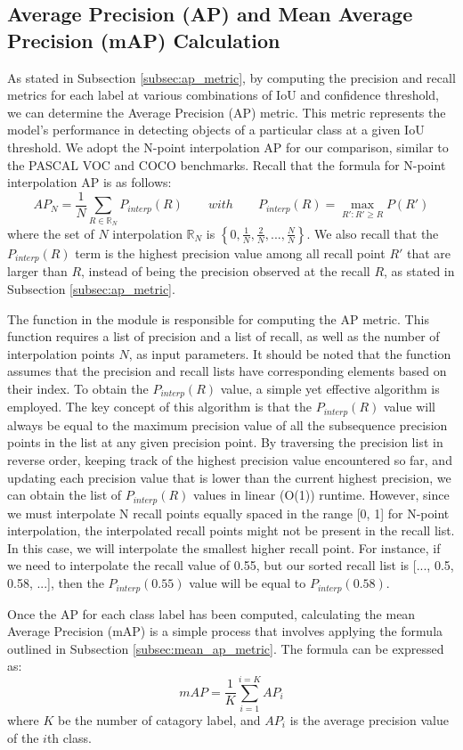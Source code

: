 \subsection{Average Precision (AP) and Mean Average Precision (mAP) Calculation}
As stated in Subsection \ref{subsec:ap_metric}, by computing the precision and recall metrics for each label at various combinations of IoU and confidence threshold, we can determine the Average Precision (AP) metric. This metric represents the model's performance in detecting objects of a particular class at a given IoU threshold. We adopt the N-point interpolation AP for our comparison, similar to the PASCAL VOC and COCO benchmarks. Recall that the formula for N-point interpolation AP is as follows:
\begin{equation}
    AP_N = \frac{1}{N} \sum_{R \in \mathbb{R}_N} P_{interp}(R) \qquad with \qquad P_{interp}(R) = \max_{{R}':{R}' \geq R} P({R}')
\end{equation}
where the set of $N$ interpolation $\mathbb{R}_N$ is $\left\{0, \frac{1}{N}, \frac{2}{N}, ..., \frac{N}{N}\right\}$. We also recall that the $P_{interp}(R)$ term is the highest precision value among all recall point ${R}'$ that are larger than $R$, instead of being the precision observed at the recall $R$, as stated in Subsection \ref{subsec:ap_metric}.

The  function in the  module is responsible for computing the AP metric. This function requires a list of precision and a list of recall, as well as the number of interpolation points $N$, as input parameters. It should be noted that the function assumes that the precision and recall lists have corresponding elements based on their index. To obtain the $P_{interp}(R)$ value, a simple yet effective algorithm is employed. The key concept of this algorithm is that the $P_{interp}(R)$ value will always be equal to the maximum precision value of all the subsequence precision points in the list at any given precision point. By traversing the precision list in reverse order, keeping track of the highest precision value encountered so far, and updating each precision value that is lower than the current highest precision, we can obtain the list of $P_{interp}(R)$ values in linear (O(1)) runtime. However, since we must interpolate N recall points equally spaced in the range [0, 1] for N-point interpolation, the interpolated recall points might not be present in the recall list. In this case, we will interpolate the smallest higher recall point. For instance, if we need to interpolate the recall value of 0.55, but our sorted recall list is [..., 0.5, 0.58, ...], then the $P_{interp}(0.55)$ value will be equal to $P_{interp}(0.58)$.

Once the AP for each class label has been computed, calculating the mean Average Precision (mAP) is a simple process that involves applying the formula outlined in Subsection \ref{subsec:mean_ap_metric}. The formula can be expressed as:
\begin{equation*}
    mAP = \frac{1}{K} \sum_{i=1}^{i=K}AP_i
\end{equation*}
where $K$ be the number of catagory label, and $AP_i$ is the average precision value of the $i$th class.